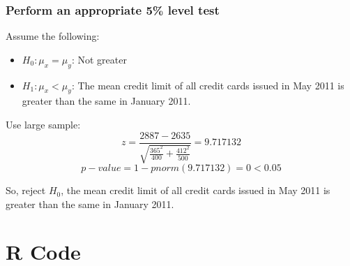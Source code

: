 \documentclass[11pt,letterpaper,titlepage,en-US]{article}
\begin{document}
\subsubsection{Perform an appropriate 5\% level test}
Assume the following:
\begin{itemize}
\item $H_0: \mu_x = \mu_y$:  Not greater
\item $H_1: \mu_x < \mu_y$:  The mean credit limit of all credit cards issued in May 2011 is greater than the same in January 2011.
\end{itemize}
Use large sample: \[z = \frac{2887 - 2635}{\sqrt{\frac{365^2}{400} + \frac{412^2}{500}}} = 9.717132\]
\[p-value = 1 - pnorm(9.717132) = 0 < 0.05\]

So, reject $H_0$, the mean credit limit of all credit cards issued in May 2011 is greater than the same in January 2011.

\section{R Code}


\end{document}
